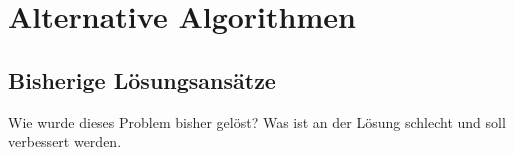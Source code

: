 \section{Alternative Algorithmen }
\label{sec:alternativeAlgorithmen}


\subsection{Bisherige Lösungsansätze} 
\label{sec:bisherigeLoesungsansaetze}
Wie wurde dieses Problem bisher gelöst? Was ist an der Lösung schlecht und soll verbessert werden.


